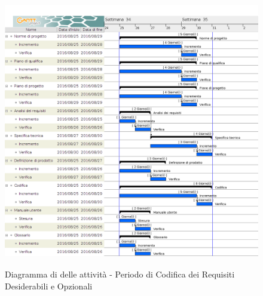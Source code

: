 		\begin{figure}[!h]
			\centering
			\includegraphics[height=12cm, width=15cm]{img/gantt/RD} 
			\caption{Diagramma di  delle attività - Periodo di Codifica dei Requisiti Desiderabili e Opzionali}
		\end{figure}
		

